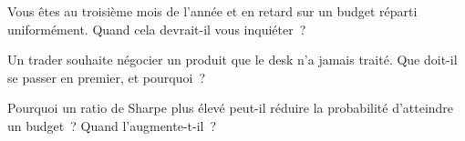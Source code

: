 \begin{interviewq}\label{iq:fm:the-head-of-desks-job:4}
Vous êtes au troisième mois de l'année et en retard sur un budget réparti uniformément. Quand cela devrait-il vous inquiéter~?
\end{interviewq}

\begin{interviewq}\label{iq:fm:the-head-of-desks-job:5}
Un trader souhaite négocier un produit que le desk n'a jamais traité. Que doit-il se passer en premier, et pourquoi~?
\end{interviewq}

\begin{interviewq}\label{iq:fm:the-head-of-desks-job:6}
Pourquoi un ratio de Sharpe plus élevé peut-il réduire la probabilité d'atteindre un budget~? Quand l'augmente-t-il~?
\end{interviewq}

